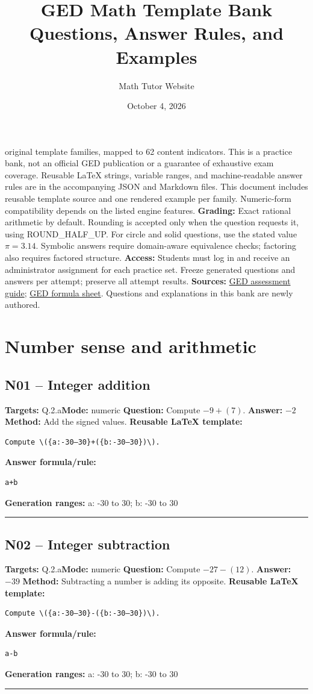 \documentclass[11pt]{article}
\begin{document}
\title{GED Math Template Bank\\\large Questions, Answer Rules, and Examples}
\author{Math Tutor Website}
\date{October 4, 2026}
 original template families, mapped to 62 content indicators. This is a practice bank, not an official GED publication or a guarantee of exhaustive exam coverage.
Reusable LaTeX strings, variable ranges, and machine-readable answer rules are in the accompanying JSON and Markdown files. This document includes reusable template source and one rendered example per family. Numeric-form compatibility depends on the listed engine features.
\textbf{Grading:} Exact rational arithmetic by default. Rounding is accepted only when the question requests it, using ROUND\_HALF\_UP. For circle and solid questions, use the stated value $\pi=3.14$. Symbolic answers require domain-aware equivalence checks; factoring also requires factored structure.
\textbf{Access:} Students must log in and receive an administrator assignment for each practice set. Freeze generated questions and answers per attempt; preserve all attempt results.
\textbf{Sources:} \href{https://www.ged.com/content/dam/websites/ged/resources/en/assessment-guide-for-educators-math.pdf}{GED assessment guide}; \href{https://www.ged.com/content/dam/websites/ged/post/math-formula-sheet.pdf}{GED formula sheet}. Questions and explanations in this bank are newly authored.
\tableofcontents
\newpage
\section{Number sense and arithmetic}
\subsection{N01 -- Integer addition}
\textbf{Targets:} Q.2.a\quad\textbf{Mode:} numeric
\textbf{Question:} Compute \(-9+(7)\).
\textbf{Answer:} \(-2\)
\textbf{Method:} Add the signed values.
\textbf{Reusable LaTeX template:}
\begin{verbatim}
Compute \({a:-30–30}+({b:-30–30})\).
\end{verbatim}
\textbf{Answer formula/rule:}
\begin{verbatim}
a+b
\end{verbatim}
\textbf{Generation ranges:} a: -30 to 30; b: -30 to 30
\medskip\hrule\medskip
\subsection{N02 -- Integer subtraction}
\textbf{Targets:} Q.2.a\quad\textbf{Mode:} numeric
\textbf{Question:} Compute \(-27-(12)\).
\textbf{Answer:} \(-39\)
\textbf{Method:} Subtracting a number is adding its opposite.
\textbf{Reusable LaTeX template:}
\begin{verbatim}
Compute \({a:-30–30}-({b:-30–30})\).
\end{verbatim}
\textbf{Answer formula/rule:}
\begin{verbatim}
a-b
\end{verbatim}
\textbf{Generation ranges:} a: -30 to 30; b: -30 to 30
\medskip\hrule\medskip
\end{document}
